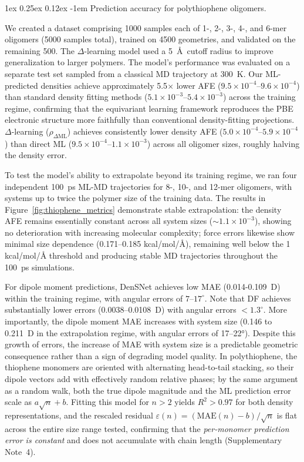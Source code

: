 \documentclass[12pt]{article}
\makeatletter
\renewcommand\paragraph{\@startsection{paragraph}{4}{\parindent}%
  {1ex \@plus 0.25ex \@minus 0.12ex}%
  {-1em}%
  {\normalfont\normalsize\itshape}}
\makeatother
\begin{document}
\paragraph{Prediction accuracy for polythiophene oligomers.}

We created a dataset comprising 1000 samples each of 1-, 2-, 3-, 4-, and 6-mer oligomers (5000 samples total), trained on 4500 geometries, and validated on the remaining 500.
The $\Delta$-learning model used a 5~\AA\ cutoff radius to improve generalization to larger polymers.
The model's performance was evaluated on a separate test set sampled from a classical MD trajectory at 300~K.
Our ML-predicted densities achieve approximately 5.5$\times$ lower AFE ($9.5\times10^{-4}$--$9.6\times10^{-4}$) than standard density fitting methods ($5.1\times10^{-3}$--$5.4\times10^{-3}$) across the training regime, confirming that the equivariant learning framework reproduces the PBE electronic structure more faithfully than conventional density-fitting projections. 
$\Delta$-learning ($\rho_{\Delta\mathrm{ML}}$) achieves consistently lower density AFE ($5.0\times10^{-4}$--$5.9\times10^{-4}$) than direct ML ($9.5\times10^{-4}$--$1.1\times10^{-3}$) across all oligomer sizes, roughly halving the density error.

To test the model's ability to extrapolate beyond its training regime, we ran four independent 100~ps ML-MD trajectories for 8-, 10-, and 12-mer oligomers, with systems up to twice the polymer size of the training data. 
The results in Figure~\ref{fig:thiophene_metrics} demonstrate stable extrapolation: the density AFE remains essentially constant across all system sizes (${\sim}1.1\times10^{-3}$), showing no deterioration with increasing molecular complexity; force errors likewise show minimal size dependence (0.171--0.185 kcal/mol/Å), remaining well below the 1 kcal/mol/Å threshold and producing stable MD trajectories throughout the 100~ps simulations.

For dipole moment predictions, DenSNet achieves low MAE (0.014-0.109~D) within the training regime, with angular errors of $7$--$17^\circ$. 
Note that DF achieves substantially lower errors (0.0038--0.0108~D) with angular errors $<1.3^\circ$. 
More importantly, the dipole moment MAE increases with system size (0.146 to 0.211~D in the extrapolation regime, with angular errors of 17--22°). 
Despite this growth of errors, the increase of MAE with system size is a predictable geometric consequence rather than a sign of degrading model quality. 
In polythiophene, the thiophene monomers are oriented with alternating head-to-tail stacking, so their dipole vectors add with effectively random relative phases; by the same argument as a random walk, both the true dipole magnitude and the ML prediction error scale as $a\sqrt{n}+b$. Fitting this model for $n>2$ yields $R^2>0.97$ for both density representations, and the rescaled residual $\varepsilon(n)=(\mathrm{MAE}(n)-b)/\sqrt{n}$ is flat across the entire size range tested, confirming that the \emph{per-monomer prediction error is constant} and does not accumulate with chain length (Supplementary Note~4). 
\end{document}
